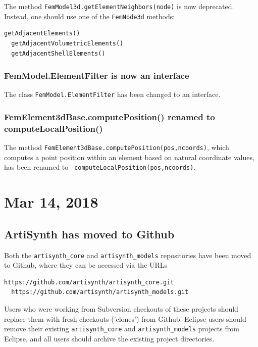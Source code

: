 \documentclass{article}
\begin{document}
The method {\tt FemModel3d.getElementNeighbors(node)} is now
deprecated. Instead, one should use one of the {\tt FemNode3d}
methods: 
%
\begin{lstlisting}[]
  getAdjacentElements()
  getAdjacentVolumetricElements()
  getAdjacentShellElements()
\end{lstlisting}
%

\subsubsection*{FemModel.ElementFilter is now an interface}

The class {\tt FemModel.ElementFilter} has been changed to an interface.

\subsubsection*{FemElement3dBase.computePosition() renamed to computeLocalPosition()}

The method {\tt FemElement3dBase.computePosition(pos,ncoords)}, which
computes a point position within an element based on natural
coordinate values, has been renamed to {\tt
computeLocalPosition(pos,ncoords)}.

\section*{Mar 14, 2018}

\subsection*{ArtiSynth has moved to Github}

Both the {\tt artisynth\_core} and {\tt artisynth\_models}
repositories have been moved to Github, where they can
be accessed via the URLs
%
\begin{lstlisting}[]
  https://github.com/artisynth/artisynth_core.git
  https://github.com/artisynth/artisynth_models.git
\end{lstlisting}
%
Users who were working from Subversion checkouts of these projects
should replace them with fresh checkouts ('clones') from Github.
Eclipse users should remove their existing {\tt artisynth\_core} and
{\tt artisynth\_models} projects from Eclipse, and all users should
archive the existing project directories.
\end{document}
